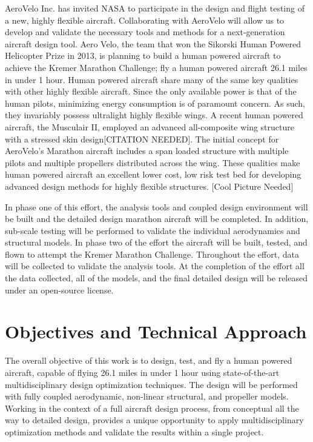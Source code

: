 \documentclass[]{aiaa-tc}
\begin{document}
    AeroVelo Inc. has invited NASA to participate in the design and flight testing of a new, highly flexible aircraft. 
    Collaborating with AeroVelo will allow us to develop and validate the necessary tools and methods for a 
    next-generation aircraft design tool. Aero Velo, the team that won the Sikorski Human Powered Helicopter Prize in 2013, 
    is planning to build a human powered aircraft to achieve the Kremer Marathon Challenge; fly a human 
    powered aircraft 26.1 miles in under 1 hour. Human powered aircraft share many of the same key qualities 
    with other highly flexible aircraft. Since the only available power is that of the human pilots, minimizing 
    energy consumption is of paramount concern. As such, they invariably possess ultralight highly flexible wings. 
    A recent human powered aircraft, the Musculair II, employed an advanced all-composite wing structure 
    with a stressed skin design[CITATION NEEDED]. The initial concept for AeroVelo's Marathon aircraft includes 
    a span loaded structure with multiple pilots and multiple propellers distributed across the wing. These qualities 
    make human powered aircraft an excellent lower cost, low risk test bed for developing advanced design methods 
    for highly flexible structures. [Cool Picture Needed]

    In phase one of this effort, the analysis tools and coupled design environment will be built and 
    the detailed design marathon aircraft will be completed. In addition, sub-scale testing will be 
    performed to validate the individual aerodynamics and structural models. In phase two of the effort
    the aircraft will be built, tested, and flown to attempt the Kremer Marathon Challenge. Throughout 
    the effort, data will be collected to validate the analysis tools. At the completion of the effort 
    all the data collected, all of the models, and the final detailed design will be released under 
    an open-source license.

  \section{Objectives and Technical Approach}

    The overall objective of this work is to design, test, and fly a human powered aircraft, 
    capable of flying 26.1 miles in under 1 hour using state-of-the-art multidisciplinary 
    design optimization techniques. The design will be performed with fully coupled
    aerodynamic, non-linear structural, and propeller models. Working in the context of 
    a full aircraft design process, from conceptual all the way to detailed design, 
    provides a unique opportunity to apply multidisciplinary optimization methods and validate
    the results within a single project. 
\end{document}
